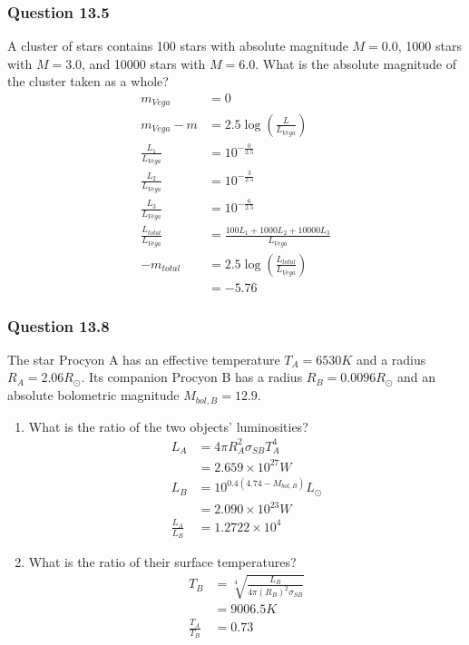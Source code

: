 \documentclass{math}
\begin{document}
\subsubsection*{Question 13.5}
A cluster of stars contains 100 stars with absolute magnitude \( M = 0.0 \),
1000 stars with \( M = 3.0 \), and 10000 stars with \( M = 6.0 \). What is the
absolute magnitude of the cluster taken as a whole?
\begin{align*}
  m_{Vega} &= 0 \\
  m_{Vega}-m &= 2.5\log(\frac{L}{L_{Vega}}) \\
  \frac{L_1}{L_{Vega}} &= 10^{-\frac{0}{2.5}} \\
  \frac{L_2}{L_{Vega}} &= 10^{-\frac{3}{2.5}} \\
  \frac{L_3}{L_{Vega}} &= 10^{-\frac{6}{2.5}} \\
  \frac{L_{total}}{L_{Vega}} &= \frac{100L_1+1000L_2+10000L_3}{L_{Vega}} \\
  -m_{total} &= 2.5\log(\frac{L_{total}}{L_{Vega}}) \\
  &= -5.76
\end{align*}

\subsubsection*{Question 13.8}
The star Procyon A has an effective temperature \( T_A = 6530K \) and a radius
\( R_A = 2.06R_{\odot} \). Its companion Procyon B has a radius
\( R_B = 0.0096R_{\odot} \) and an absolute bolometric magnitude
\( M_{bol,B} = 12.9 \).
\begin{enumerate}
  \item What is the ratio of the two objects' luminosities?
  \begin{align*}
    L_A &= 4\pi R_A^2\sigma_{SB}T_A^4 \\
    &= 2.659\times10^{27}W \\
    L_B &= 10^{0.4(4.74-M_{bol,B})}L_{\odot} \\
    &= 2.090\times10^{23}W \\
    \frac{L_A}{L_B} &= 1.2722\times10^4
  \end{align*}
  \item What is the ratio of their surface temperatures?
  \begin{align*}
    T_B &= \sqrt[4]{\frac{L_B}{4\pi(R_B)^2\sigma_{SB}}} \\
    &= 9006.5K \\
    \frac{T_A}{T_B} &= 0.73
  \end{align*}
\end{enumerate}
\end{document}
